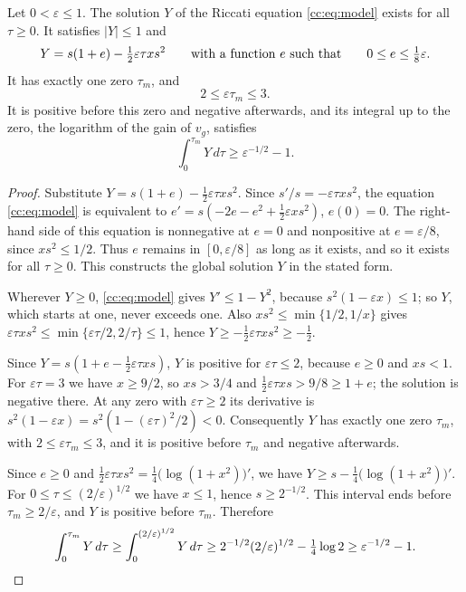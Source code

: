 \begin{lemma}\label{cc:lem:model}
Let $0<\varepsilon\le1$. The solution $Y$ of the Riccati equation
\eqref{cc:eq:model} exists for all $\tau\ge0$. It satisfies $|Y|\le1$
and
\[
 Y=s(1+e)-\tfrac12\varepsilon\tau xs^2\qquad\hbox{with a function $e$ such that}\qquad
 0\le e\le\tfrac18\varepsilon .
\]
It has exactly one zero $\tau_m$, and
\[
 2\le\varepsilon\tau_m\le3 .
\]
It is positive before this zero and negative afterwards, and its
integral up to the zero, the logarithm of the gain of $v_g$, satisfies
\[
 \int_0^{\tau_m}Y\,d\tau\ge\varepsilon^{-1/2}-1.
\]
\end{lemma}
\begin{proof}
Substitute $Y=s(1+e)-\tfrac12\varepsilon\tau xs^2$. Since
$s'/s=-\varepsilon\tau xs^2$, the equation \eqref{cc:eq:model} is
equivalent to $e'=s(-2e-e^2+\tfrac12\varepsilon xs^2)$, $e(0)=0$. The
right-hand side of this equation is nonnegative at $e=0$ and
nonpositive at $e=\varepsilon/8$, since $xs^2\le1/2$. Thus $e$ remains
in $[0,\varepsilon/8]$ as long as it exists, and so it exists for all
$\tau\ge0$. This constructs the global solution $Y$ in the stated form.

Wherever $Y\ge0$, \eqref{cc:eq:model} gives $Y'\le1-Y^2$, because
$s^2(1-\varepsilon x)\le1$; so $Y$, which starts at one, never exceeds
one. Also $xs^2\le\min\{1/2,1/x\}$ gives
$\varepsilon\tau xs^2\le\min\{\varepsilon\tau/2,2/\tau\}\le1$, hence
$Y\ge-\tfrac12\varepsilon\tau xs^2\ge-\tfrac12$.

Since $Y=s(1+e-\tfrac12\varepsilon\tau xs)$, $Y$ is positive for
$\varepsilon\tau\le2$, because $e\ge0$ and $xs<1$. For
$\varepsilon\tau=3$ we have $x\ge9/2$, so $xs>3/4$ and
$\tfrac12\varepsilon\tau xs>9/8\ge1+e$; the solution is negative
there. At any zero with $\varepsilon\tau\ge2$ its derivative is
$s^2(1-\varepsilon x)=s^2(1-(\varepsilon\tau)^2/2)<0$. Consequently
$Y$ has exactly one zero $\tau_m$, with $2\le\varepsilon\tau_m\le3$, and
it is positive before $\tau_m$ and negative afterwards.

Since $e\ge0$ and
$\tfrac12\varepsilon\tau xs^2=\tfrac14\bigl(\log(1+x^2)\bigr)'$, we have
$Y\ge s-\tfrac14\bigl(\log(1+x^2)\bigr)'$. For
$0\le\tau\le(2/\varepsilon)^{1/2}$ we have $x\le1$, hence
$s\ge2^{-1/2}$. This interval ends before $\tau_m\ge2/\varepsilon$, and
$Y$ is positive before $\tau_m$. Therefore
\[
 \int_0^{\tau_m}Y\,d\tau
 \ge\int_0^{(2/\varepsilon)^{1/2}}Y\,d\tau
 \ge2^{-1/2}(2/\varepsilon)^{1/2}-\tfrac14\log2
 \ge\varepsilon^{-1/2}-1 .
 \qedhere
\]
\end{proof}

